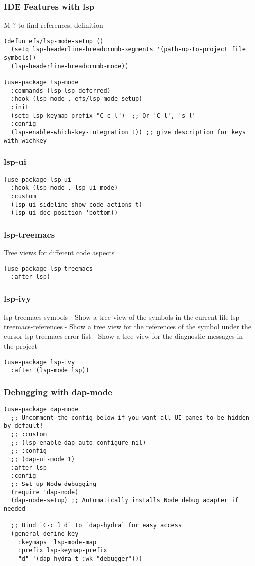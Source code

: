 \documentclass[11pt]{article}
\begin{document}
\subsubsection{IDE Features with lsp}
\label{sec:org78709e4}
M-? to find references, definition
\begin{verbatim}
(defun efs/lsp-mode-setup ()
  (setq lsp-headerline-breadcrumb-segments '(path-up-to-project file symbols))
  (lsp-headerline-breadcrumb-mode))

(use-package lsp-mode
  :commands (lsp lsp-deferred)
  :hook (lsp-mode . efs/lsp-mode-setup)
  :init
  (setq lsp-keymap-prefix "C-c l")  ;; Or 'C-l', 's-l'
  :config
  (lsp-enable-which-key-integration t)) ;; give description for keys with wichkey
\end{verbatim}
\subsubsection{lsp-ui}
\label{sec:org6a7b3e5}
\begin{verbatim}
(use-package lsp-ui
  :hook (lsp-mode . lsp-ui-mode)
  :custom
  (lsp-ui-sideline-show-code-actions t)
  (lsp-ui-doc-position 'bottom))
\end{verbatim}
\subsubsection{lsp-treemacs}
\label{sec:org0edba9b}
Tree views for different code aspects
\begin{verbatim}
(use-package lsp-treemacs
  :after lsp)
\end{verbatim}
\subsubsection{lsp-ivy}
\label{sec:orgf7fa193}
lsp-treemacs-symbols - Show a tree view of the symbols in the current file
lsp-treemacs-references - Show a tree view for the references of the symbol under the cursor
lsp-treemacs-error-list - Show a tree view for the diagnostic messages in the project

\begin{verbatim}
(use-package lsp-ivy
  :after (lsp-mode lsp))
\end{verbatim}
\subsubsection{Debugging with dap-mode}
\label{sec:org0d02a60}
\begin{verbatim}
(use-package dap-mode
  ;; Uncomment the config below if you want all UI panes to be hidden by default!
  ;; :custom
  ;; (lsp-enable-dap-auto-configure nil)
  ;; :config
  ;; (dap-ui-mode 1)
  :after lsp
  :config
  ;; Set up Node debugging
  (require 'dap-node)
  (dap-node-setup) ;; Automatically installs Node debug adapter if needed

  ;; Bind `C-c l d` to `dap-hydra` for easy access
  (general-define-key
    :keymaps 'lsp-mode-map
    :prefix lsp-keymap-prefix
    "d" '(dap-hydra t :wk "debugger")))
\end{verbatim}
\end{document}
